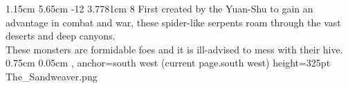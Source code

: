 {%
	{1.15cm}%
	{5.65cm}%
	{-12}%
	{3.7781cm}%
	{8}%
	{%
		First created by the Yuan-Shu to gain an advantage in combat and war, these spider-like serpents roam through the vast deserts and deep canyons.\\These monsters are formidable foes and it is ill-advised to mess with their hive. %
	}%
}%
{0.75cm}%
{0.05cm}%
{, anchor=south west}%
{(current page.south west)}%
{height=325pt}%
{The_Sandweaver.png}%
%

\vfill\eject


